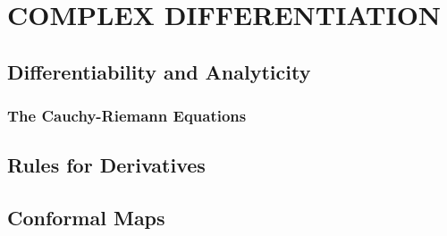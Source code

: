 \section{COMPLEX DIFFERENTIATION}
\subsection{Differentiability and Analyticity}
\subsubsection{The Cauchy-Riemann Equations}
\subsection{Rules for Derivatives}
\subsection{Conformal Maps}
